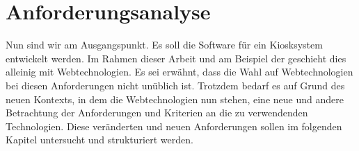 \chapter{Anforderungsanalyse}
\label{section:anforderungen}

Nun sind wir am Ausgangspunkt. Es soll die Software für ein Kiosksystem
entwickelt werden. Im Rahmen dieser Arbeit und am Beispiel der \shst{}
geschieht dies alleinig mit Webtechnologien. Es sei erwähnt, dass die Wahl
auf Webtechnologien bei diesen Anforderungen nicht unüblich ist.
Trotzdem bedarf es auf Grund des neuen Kontexts, in dem die Webtechnologien nun stehen,
eine neue und andere Betrachtung der Anforderungen und Kriterien an die 
zu verwendenden Technologien. Diese veränderten und neuen Anforderungen sollen 
im folgenden Kapitel untersucht und strukturiert werden.



